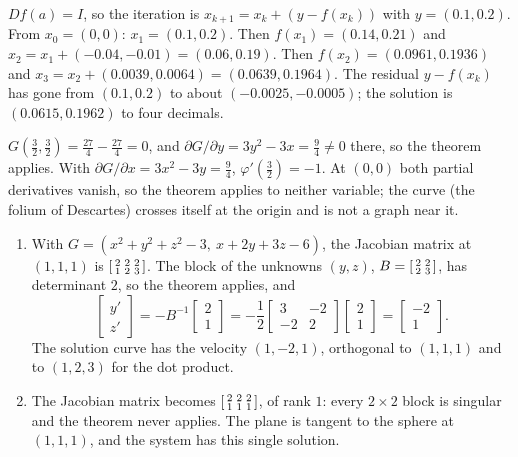 $Df(a) = I$, so the iteration is $x_{k+1} = x_k + (y - f(x_k))$ with
$y = (0.1, 0.2)$. From $x_0 = (0, 0)$: $x_1 = (0.1, 0.2)$. Then
$f(x_1) = (0.14, 0.21)$ and
$x_2 = x_1 + (-0.04, -0.01) = (0.06, 0.19)$. Then
$f(x_2) = (0.0961, 0.1936)$ and
$x_3 = x_2 + (0.0039, 0.0064) = (0.0639, 0.1964)$. The residual
$y - f(x_k)$ has gone from $(0.1, 0.2)$ to about $(-0.0025, -0.0005)$;
the solution is $(0.0615, 0.1962)$ to four decimals.

$G(\frac32, \frac32) = \frac{27}4 - \frac{27}4 = 0$, and
$\partial G/\partial y = 3y^2 - 3x = \frac94\neq0$ there, so the theorem
applies. With $\partial G/\partial x = 3x^2 - 3y = \frac94$,
$\varphi'(\frac32) = -1$. At $(0, 0)$ both partial derivatives vanish, so
the theorem applies to neither variable; the curve (the folium of
Descartes) crosses itself at the origin and is not a graph near it.

\begin{enumerate}[nosep]
  \item With $G = (x^2 + y^2 + z^2 - 3,\ x + 2y + 3z - 6)$, the Jacobian
        matrix at $(1, 1, 1)$ is
        $\begin{bsmallmatrix}2 & 2 & 2\\1 & 2 & 3\end{bsmallmatrix}$. The
        block of the unknowns $(y, z)$,
        $B = \begin{bsmallmatrix}2 & 2\\2 & 3\end{bsmallmatrix}$, has
        determinant $2$, so the theorem applies, and
        \[
          \begin{bmatrix}y'\\z'\end{bmatrix}
          = -B^{-1}\begin{bmatrix}2\\1\end{bmatrix}
          = -\frac12\begin{bmatrix}3 & -2\\-2 & 2\end{bmatrix}
            \begin{bmatrix}2\\1\end{bmatrix}
          = \begin{bmatrix}-2\\1\end{bmatrix} .
        \]
        The solution curve has the velocity $(1, -2, 1)$, orthogonal to
        $(1, 1, 1)$ and to $(1, 2, 3)$ for the dot product.
  \item The Jacobian matrix becomes
        $\begin{bsmallmatrix}2 & 2 & 2\\1 & 1 & 1\end{bsmallmatrix}$, of
        rank $1$: every $2\times2$ block is singular and the theorem
        never applies. The plane is tangent to the sphere at $(1, 1, 1)$,
        and the system has this single solution.
\end{enumerate}

